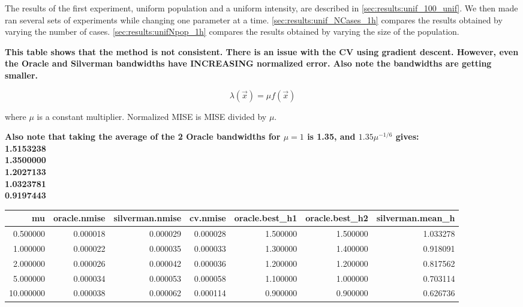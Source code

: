 The results of the first experiment, uniform population and a uniform intensity,
are described in \autoref{sec:results:unif_100_unif}.
We then made ran several sets of experiments while changing one parameter at a time.
\autoref{sec:results:unif_NCases_1h} compares the results obtained by varying the number of cases.
\autoref{sec:results:unifNpop_1h} compares the results obtained by varying the size of the population.

\textbf{
\color{red}
This table shows that the method is not consistent.
There is an issue with the CV using gradient descent.
However, even the Oracle and Silverman bandwidths have INCREASING normalized error.
Also note the bandwidths are getting smaller.
}

$$
\lambda(\vec{x}) = \mu f\!(\vec{x})
$$

where $\mu$ is a constant multiplier.
Normalized MISE is MISE divided by $\mu$.

\textbf{
    \color{red}
    Also note that taking the average of the 2 Oracle bandwidths for $\mu=1$ is 1.35,
    and $1.35 \mu^{-1/6}$ gives:
    \\
    1.5153238 \\
    1.3500000 \\
    1.2027133 \\
    1.0323781 \\
    0.9197443
}

\begin{table}[ht]
\centering
\small
\color{red}
\begin{tabular}{rrrrrrr}
  \hline
mu & oracle.nmise & silverman.nmise & cv.nmise & oracle.best\_h1 & oracle.best\_h2 & silverman.mean\_h \\ 
  \hline
0.500000 & 0.000018 & 0.000029 & 0.000028 & 1.500000 & 1.500000 & 1.033278 \\ 
  1.000000 & 0.000022 & 0.000035 & 0.000033 & 1.300000 & 1.400000 & 0.918091 \\ 
  2.000000 & 0.000026 & 0.000042 & 0.000036 & 1.200000 & 1.200000 & 0.817562 \\ 
  5.000000 & 0.000034 & 0.000053 & 0.000058 & 1.100000 & 1.000000 & 0.703114 \\ 
  10.000000 & 0.000038 & 0.000062 & 0.000114 & 0.900000 & 0.900000 & 0.626736 \\ 
   \hline
\end{tabular}
\end{table}

